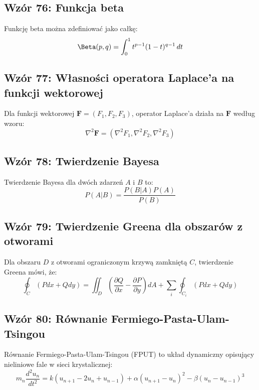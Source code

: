 \documentclass{article}
\begin{document}
\subsection*{Wzór 76: Funkcja beta}

Funkcję beta można zdefiniować jako całkę:
\[ \Beta(p, q) = \int_{0}^{1} t^{p-1}(1-t)^{q-1} \, dt \]

\subsection*{Wzór 77: Własności operatora Laplace'a na funkcji wektorowej}

Dla funkcji wektorowej \(\mathbf{F} = (F_1, F_2, F_3)\), operator Laplace'a działa na \(\mathbf{F}\) według wzoru:
\[ \nabla^2 \mathbf{F} = (\nabla^2 F_1, \nabla^2 F_2, \nabla^2 F_3) \]

\subsection*{Wzór 78: Twierdzenie Bayesa}

Twierdzenie Bayesa dla dwóch zdarzeń \(A\) i \(B\) to:
\[ P(A|B) = \frac{P(B|A)P(A)}{P(B)} \]

\subsection*{Wzór 79: Twierdzenie Greena dla obszarów z otworami}

Dla obszaru \(D\) z otworami ograniczonym krzywą zamkniętą \(C\), twierdzenie Greena mówi, że:
\[ \oint_C (Pdx + Qdy) = \iint_D \left(\frac{\partial Q}{\partial x} - \frac{\partial P}{\partial y}\right) dA + \sum_{i} \oint_{C_i} (Pdx + Qdy) \]

\subsection*{Wzór 80: Równanie Fermiego-Pasta-Ulam-Tsingou}

Równanie Fermiego-Pasta-Ulam-Tsingou (FPUT) to układ dynamiczny opisujący nieliniowe fale w sieci krystalicznej:
\[ m_n \frac{d^2u_n}{dt^2} = k(u_{n+1} - 2u_n + u_{n-1}) + \alpha(u_{n+1} - u_n)^2 - \beta(u_n - u_{n-1})^3 \]
\end{document}
